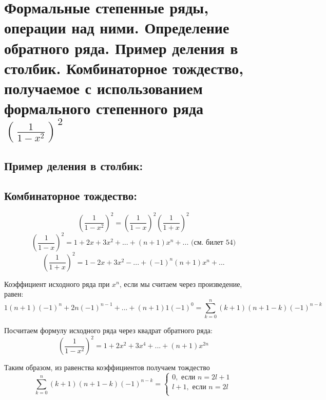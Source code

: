 \section{Формальные степенные ряды, операции над ними. Определение обратного ряда. Пример деления в столбик. Комбинаторное тождество, получаемое с использованием формального степенного ряда $(\frac{1}{1-x^2})^2$}
\subsection*{Пример деления в столбик:}
\begin{figure}[h]
\end{figure}
\par
\subsection*{Комбинаторное тождество:} 
$$\left(\frac{1}{1-x^2}\right)^2=\left(\frac{1}{1-x}\right)^2\left(\frac{1}{1+x}\right)^2$$
$$\left(\frac{1}{1-x}\right)^2=1+2x+3x^2+...+(n+1)x^n+... \mbox{ (см. билет 54)}$$
$$\left(\frac{1}{1+x}\right)^2=1-2x+3x^2-...+(-1)^n(n+1)x^n+...$$
\par Коэффициент исходного ряда при $x^n$, если мы считаем через произведение, равен:
$$1(n+1)(-1)^n+2n(-1)^{n-1}+...+(n+1)1(-1)^0=\sum_{k=0}^n (k+1)(n+1-k)(-1)^{n-k}$$
\par Посчитаем формулу исходного ряда через квадрат обратного ряда:
$$\left(\frac{1}{1-x^2}\right)^2=1+2x^2+3x^4+...+(n+1)x^{2n}$$
\par Таким образом, из равенства коэффициентов получаем тождество
$$\sum_{k=0}^n (k+1)(n+1-k)(-1)^{n-k} = \left\{
\begin{array}{ccc}
0, \mbox{ если } n=2l+1\\
l+1, \mbox{ если } n=2l\\
\end{array}
\right. $$


